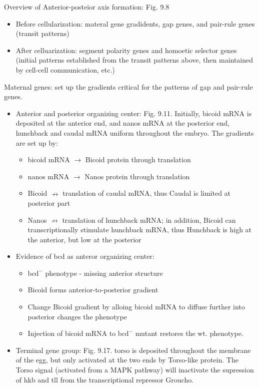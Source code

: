 \documentclass{report}
\begin{document}
Overview of Anterior-posteior axis formation: Fig. 9.8
\begin{itemize}
\item Before cellularization: materal gene gradidents, gap genes, and pair-rule genes (transit patterns)
\item After celluarization: segment polarity genes and homoetic selector genes (initial patterns established from the transit patterns above, then maintained by cell-cell communication, etc.)
\end{itemize}

Maternal genes: set up the gradients critical for the patterns of gap and pair-rule genes. 
\begin{itemize}
\item Anterior and posterior organizing center: Fig. 9.11. Initially, bicoid mRNA is deposited at the anterior end, and nanos mRNA at the posterior end, hunchback and caudal mRNA uniform throughout the embryo. The gradients are set up by: 
\begin{itemize}
\item bicoid mRNA $\rightarrow$ Bicoid protein through translation
\item nanos mRNA $\rightarrow$ Nanos protein through translation
\item Bicoid $\nrightarrow$ translation of caudal mRNA, thus Caudal is limited at posterior part
\item Nanos $\nrightarrow$ translation of hunchback mRNA; in addition, Bicoid can transcriptionally stimulate hunchback mRNA, thus Hunchback is high at the anterior, but low at the posterior
\end{itemize}
\item Evidence of bcd as anteror organizing center: 
\begin{itemize}
\item $\text{bcd}^-$ phenotype - missing anterior structure
\item Bicoid forms anterior-to-posterior gradient
\item Change Bicoid gradient by alloing bicoid mRNA to diffuse further into posterior changes the phenotype
\item Injection of bicoid mRNA to $\text{bcd}^-$ mutant restores the wt. phenotype. 
\end{itemize}
\item Terminal gene group: Fig. 9.17. torso is deposited throughout the membrane of the egg, but only activated at the two ends by Torso-like protein. The Torso signal (activated from a MAPK pathway) will inactivate the supression of hkb and tll from the transcriptional repressor Groucho. 
\end{itemize}
\end{document}
